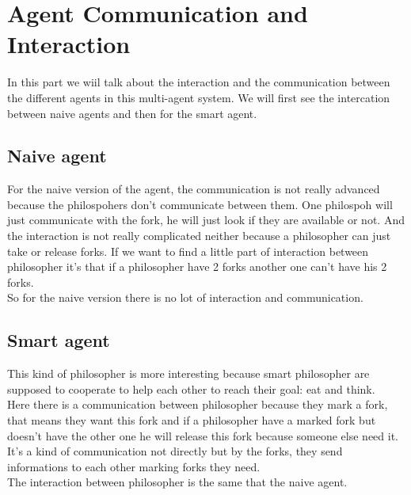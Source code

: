 \section{Agent Communication and Interaction}
In this part we wiil talk about the interaction and the communication between the different agents in this multi-agent system. We will first see the intercation between naive agents and then for the smart agent.

\subsection{Naive agent}
For the naive version of the agent, the communication is not really advanced because the philospohers don't communicate between them. One philospoh will just communicate with the fork, he will just look if they are available or not. And the interaction is not really complicated neither because a philosopher can just take or release forks. If we want to find a little part of interaction between philosopher it's that if a philosopher have 2 forks another one can't have his 2 forks.\\
So for the naive version there is no lot of interaction and communication.

\subsection{Smart agent}
This kind of philosopher is more interesting because smart philosopher are supposed to cooperate to help each other to reach their goal: eat and think.\\
Here there is a communication between philosopher because they mark a fork, that means they want this fork and if a philosopher have a marked fork but doesn't have the other one he will release this fork because someone else need it.\\
It's a kind of communication not directly but by the forks, they send informations to each other marking forks they need.\\
The interaction  between philosopher is the same that the naive agent.
